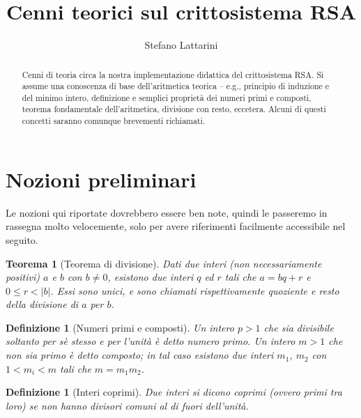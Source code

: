 \documentclass[pdflatex,11pt,a4paper,oneside]{article}
\newcommand{\theauthor}[0]{Stefano Lattarini}
\newcommand{\thetitle}[0]{Cenni teorici sul crittosistema RSA}
\newcommand{\abs}[1]{\left|{#1}\right|}
\newtheorem{theorem}[TheoremLike]{Teorema}
\newtheorem{definition}[TheoremLike]{Definizione}
\begin{document}
\title{\thetitle}
\author{\theauthor}

\maketitle


\begin{abstract}
  Cenni di teoria circa la nostra implementazione didattica del
  crittosistema RSA.  Si assume una conoscenza di base dell'aritmetica
  teorica -- e.g., principio di induzione e del minimo intero, definizione
  e semplici propriet\`a dei numeri primi e composti, teorema fondamentale
  dell'aritmetica, divisione con resto, eccetera.  Alcuni di questi
  concetti saranno comunque brevementi richiamati.
\end{abstract}


\section{Nozioni preliminari}

Le nozioni qui riportate dovrebbero essere ben note, quindi le
passeremo in rassegna molto velocemente, solo per avere riferimenti
facilmente accessibile nel seguito.

\begin{theorem}[Teorema di divisione]
Dati due interi (non necessariamente positivi) $a$ e $b$ con $b \neq 0$,
esistono due interi $q$ ed $r$ tali che $a = bq + r$ e $0 \leq r
< \abs{b}$. Essi sono unici, e sono chiamati rispettivamente
\emph{quoziente} e \emph{resto} della divisione di $a$ per $b$.
\end{theorem}

\begin{definition}[Numeri primi e composti]
Un intero $p > 1$ che sia divisibile soltanto per s\`e stesso e per
l'unit\`a \`e detto \emph{numero primo}.  Un intero $m > 1$ che non
sia primo \`e detto \emph{composto}; in tal caso esistono due interi
$m_1$, $m_2$ con $1 < m_i < m$ tali che $m = m_1 m_2$.
\end{definition}

\begin{definition}[Interi coprimi]
Due interi si dicono \emph{coprimi} (ovvero \emph{primi tra loro}) se
non hanno divisori comuni al di fuori dell'unit\`a.
\end{definition}
\end{document}
